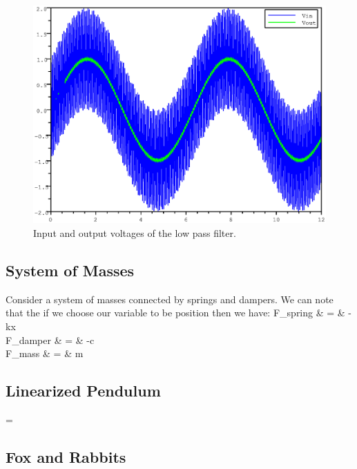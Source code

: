 \begin{figure}
\begin{center}
\caption{Input and output voltages of the low pass filter.}
\includegraphics[width=.8\textwidth]{lowpass}
\end{center}
\end{figure}

\subsection{System of Masses}
Consider a system of masses connected by springs and dampers.  We can note that the if we choose our variable to be position then we have:
\beqn
F_{spring} & = & -kx \\
F_{damper} & = & -c \\
F_{mass} & = & m
\eeqn

\subsection{Linearized Pendulum}
\beqn
\dot{\left[\begin{matrix}x_{1}\cr
                   x_{2}\end{matrix}\right]}
=
\left[\begin{matrix}x_{1}\cr
              x_{2}\end{matrix}\right]
\eeqn


\subsection{Fox and Rabbits}

